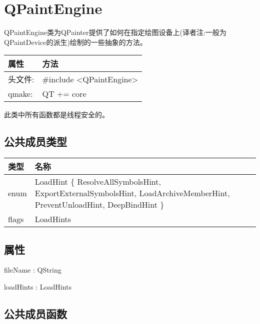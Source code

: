 \chapter{QPaintEngine}


QPaintEngine类为QPainter提供了如何在指定绘图设备上(译者注:一般为QPaintDevice的派生)绘制的一些抽象的方法。

\begin{tabular}{|l|l|}
\hline
属性 &	方法\\
\hline
头文件:& 	\#include <QPaintEngine>\\
\hline
qmake:& 	QT += core\\
\hline
\end{tabular}

\begin{notice}
此类中所有函数都是线程安全的。
\end{notice}

\section{公共成员类型}

\begin{tabular}{|l|m{23em}|}
\hline
类型 &	名称\\
\hline
enum &	LoadHint \{ ResolveAllSymbolsHint, ExportExternalSymbolsHint,
       LoadArchiveMemberHint, PreventUnloadHint, DeepBindHint \}\\
\hline
flags &	LoadHints \\ 
\hline
\end{tabular}

\section{属性}

\begin{compactitem}
\item fileName : QString
\item loadHints : LoadHints
\end{compactitem}

\section{公共成员函数}

